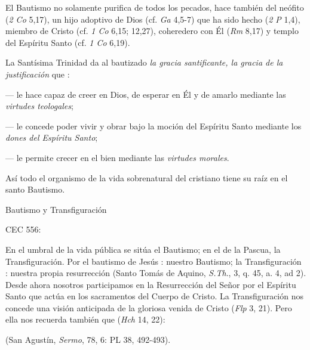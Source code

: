 	
	 El Bautismo no solamente purifica de todos los pecados, hace también del neófito  (\emph{2 Co} 5,17), un hijo adoptivo de Dios (cf. \emph{Ga} 4,5-7) que ha sido hecho  (\emph{2 P} 1,4), miembro de Cristo (cf. \emph{1 Co} 6,15; 12,27), coheredero con Él (\emph{Rm} 8,17) y templo del Espíritu Santo (cf. \emph{1 Co} 6,19).
	
	 La Santísima Trinidad da al bautizado \emph{la gracia santificante, la gracia de la justificación} que :
	
	--- le hace capaz de creer en Dios, de esperar en Él y de amarlo mediante las \emph{virtudes teologales};
	
	--- le concede poder vivir y obrar bajo la moción del Espíritu Santo mediante los \emph{dones del Espíritu Santo};
	
	--- le permite crecer en el bien mediante las \emph{virtudes morales}.
	
	Así todo el organismo de la vida sobrenatural del cristiano tiene su raíz en el santo Bautismo.
	
	Bautismo y Transfiguración
	
	CEC 556:
	
	 En el umbral de la vida pública se sitúa el Bautismo; en el de la Pascua, la Transfiguración. Por el bautismo de Jesús : nuestro Bautismo; la Transfiguración : nuestra propia resurrección (Santo Tomás de Aquino, \emph{S.Th}., 3, q. 45, a. 4, ad 2). Desde ahora nosotros participamos en la Resurrección del Señor por el Espíritu Santo que actúa en los sacramentos del Cuerpo de Cristo. La Transfiguración nos concede una visión anticipada de la gloriosa venida de Cristo  (\emph{Flp} 3, 21). Pero ella nos recuerda también que  (\emph{Hch} 14, 22):
	
	 (San Agustín, \emph{Sermo}, 78, 6: PL 38, 492-493).